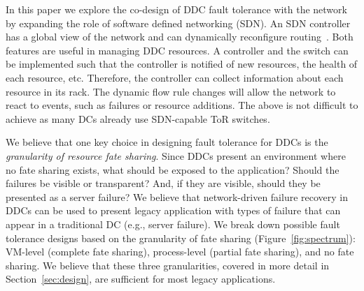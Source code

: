In this paper we explore the co-design of DDC fault tolerance with the network by expanding the
role of software defined networking (SDN). An SDN controller has
a global view of the network and can dynamically reconfigure routing~\cite{Feamster2014,Jarschel2014,Sezer2013}. Both
features are useful in managing DDC resources. A controller and the
switch can be implemented such that the controller is notified of new
resources, the health of each resource, etc. Therefore, the controller
can collect information about each resource in its rack. The
dynamic flow rule changes will allow the network to react to events,
such as failures or resource additions. The above is not difficult to achieve as
many DCs already use SDN-capable ToR switches.




We believe that one key choice in designing fault tolerance for DDCs is the
\emph{granularity of resource fate sharing}. Since DDCs present an environment where
no fate sharing exists, what should be exposed to the application?
Should the failures be visible or transparent? And, if they are visible,
should they be presented as a server failure? 
%
We believe that network-driven failure recovery in DDCs can be used to
present legacy application with types of failure that can appear in
a traditional DC (e.g., server failure).
%
We break down possible fault tolerance designs based on the
granularity of fate sharing (Figure~\ref{fig:spectrum}): VM-level
(complete fate sharing), process-level (partial fate sharing), and no
fate sharing. We believe that these three granularities, covered in
more detail in Section~\ref{sec:design}, are sufficient for most
legacy applications.

